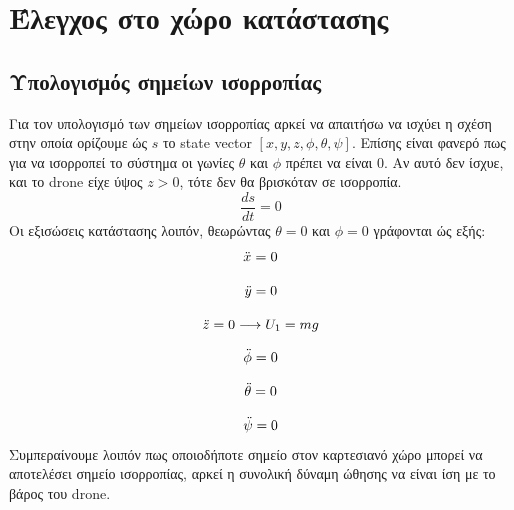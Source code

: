 \documentclass[a4paper,12pt]{article}
\begin{document}
\section{Έλεγχος στο χώρο κατάστασης}
\subsection{Υπολογισμός σημείων ισορροπίας}
Για τον υπολογισμό των σημείων ισορροπίας αρκεί να απαιτήσω να ισχύει η σχέση στην οποία ορίζουμε ώς $s$ το state vector $[x, y, z, \phi, \theta, \psi]$. Επίσης είναι φανερό πως για να ισορροπεί το σύστημα οι γωνίες $\theta$ και $\phi$ πρέπει να είναι 0. Αν αυτό δεν ίσχυε, και το drone είχε ύψος $z > 0$, τότε δεν θα βρισκόταν σε ισορροπία.
\begin{equation}
    \frac{ds}{dt} = 0
\end{equation}
\newline
Οι εξισώσεις κατάστασης λοιπόν, θεωρώντας $\theta = 0$ και $\phi = 0$ γράφονται ώς εξής:
\begin{equation}
    \Ddot{x} = 0
\end{equation}

\begin{equation}
    \Ddot{y} = 0
\end{equation}

\begin{equation}
    \Ddot{z} = 0 \longrightarrow U_1 = mg
\end{equation}


\begin{equation}
    \Ddot{\phi} = 0
\end{equation}

\begin{equation}
    \Ddot{\theta} = 0
\end{equation}

\begin{equation}
    \Ddot{\psi} = 0
\end{equation}
Συμπεραίνουμε λοιπόν πως οποιοδήποτε σημείο στον καρτεσιανό χώρο μπορεί να αποτελέσει σημείο ισορροπίας, αρκεί η συνολική δύναμη ώθησης να είναι ίση με το βάρος του drone.
\end{document}
